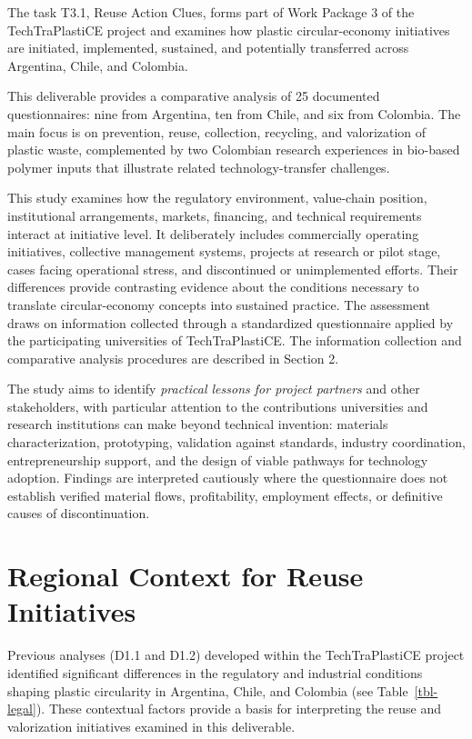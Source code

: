 \documentclass[
  12pt,
  oneside]{book}
\begin{document}
The task T3.1, Reuse Action Clues, forms part of Work Package 3 of the
TechTraPlastiCE project and examines how plastic circular-economy
initiatives are initiated, implemented, sustained, and potentially
transferred across Argentina, Chile, and Colombia.

This deliverable provides a comparative analysis of 25 documented
questionnaires: nine from Argentina, ten from Chile, and six from
Colombia. The main focus is on prevention, reuse, collection, recycling,
and valorization of plastic waste, complemented by two Colombian
research experiences in bio-based polymer inputs that illustrate related
technology-transfer challenges.

This study examines how the regulatory environment, value-chain
position, institutional arrangements, markets, financing, and technical
requirements interact at initiative level. It deliberately includes
commercially operating initiatives, collective management systems,
projects at research or pilot stage, cases facing operational stress,
and discontinued or unimplemented efforts. Their differences provide
contrasting evidence about the conditions necessary to translate
circular-economy concepts into sustained practice. The assessment draws
on information collected through a standardized questionnaire applied by
the participating universities of TechTraPlastiCE. The information
collection and comparative analysis procedures are described in Section
2.

The study aims to identify \emph{practical lessons for project partners}
and other stakeholders, with particular attention to the contributions
universities and research institutions can make beyond technical
invention: materials characterization, prototyping, validation against
standards, industry coordination, entrepreneurship support, and the
design of viable pathways for technology adoption. Findings are
interpreted cautiously where the questionnaire does not establish
verified material flows, profitability, employment effects, or
definitive causes of discontinuation.

\section{Regional Context for Reuse
Initiatives}\label{regional-context-for-reuse-initiatives}

Previous analyses (D1.1 and D1.2) developed within the TechTraPlastiCE
project identified significant differences in the regulatory and
industrial conditions shaping plastic circularity in Argentina, Chile,
and Colombia (see Table~\ref{tbl-legal}). These contextual factors
provide a basis for interpreting the reuse and valorization initiatives
examined in this deliverable.
\end{document}
